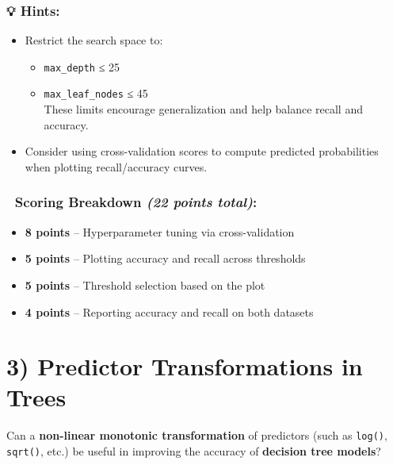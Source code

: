 \documentclass[
  letterpaper,
  DIV=11,
  numbers=noendperiod]{scrreprt}
\providecommand{\tightlist}{%
  \setlength{\itemsep}{0pt}\setlength{\parskip}{0pt}}\usepackage{longtable,booktabs,array}
\begin{document}
\subsubsection{💡 Hints:}\label{hints}

\begin{itemize}
\tightlist
\item
  Restrict the search space to:

  \begin{itemize}
  \tightlist
  \item
    \texttt{max\_depth} ≤ 25\\
  \item
    \texttt{max\_leaf\_nodes} ≤ 45\\
    These limits encourage generalization and help balance recall and
    accuracy.
  \end{itemize}
\item
  Consider using cross-validation scores to compute predicted
  probabilities when plotting recall/accuracy curves.
\end{itemize}

\subsubsection{\texorpdfstring{📝 Scoring Breakdown \emph{(22 points
total)}:}{📝 Scoring Breakdown (22 points total):}}\label{scoring-breakdown-22-points-total}

\begin{itemize}
\tightlist
\item
  \textbf{8 points} -- Hyperparameter tuning via cross-validation\\
\item
  \textbf{5 points} -- Plotting accuracy and recall across thresholds\\
\item
  \textbf{5 points} -- Threshold selection based on the plot\\
\item
  \textbf{4 points} -- Reporting accuracy and recall on both datasets
\end{itemize}

\section{3) Predictor Transformations in
Trees}\label{predictor-transformations-in-trees}

Can a \textbf{non-linear monotonic transformation} of predictors (such
as \texttt{log()}, \texttt{sqrt()}, etc.) be useful in improving the
accuracy of \textbf{decision tree models}?
\end{document}
